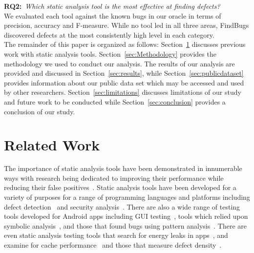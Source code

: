 \documentclass{sig-alternate}
\newcommand{\dan}[1]{\textcolor{blue}{{\it [Dan says: #1]}}}
\begin{document}
\textbf{RQ2:}~\emph{Which static analysis tool is the most effective at finding defects?}\\
We evaluated each tool against the known bugs in our oracle in terms of precision, accuracy and F-measure. While no tool led in all three areas, FindBugs discovered defects at the most consistently high level in each category. \\



The remainder of this paper is organized as follows: Section~\ref{sec:related} discusses previous work with static analysis tools. Section~\ref{sec:Methodology} provides the methodology we used to conduct our analysis. The results of our analysis are provided and discussed in Section~\ref{sec:results}, while Section~\ref{sec:publicdataset} provides information about our public data set which may be accessed and used by other researchers. Section~\ref{sec:limitations} discusses limitations of our study and future work to be conducted while Section~\ref{sec:conclusion} provides a conclusion of our study.

\newpage
\section{Related Work}
\label{sec:related}


The importance of static analysis tools have been demonstrated in innumerable ways with research being dedicated to improving their performance while reducing their false positives~\cite{joshi2014reducing}. Static analysis tools have been developed for a variety of purposes for a range of programming languages and platforms including defect detection~\cite{johnson2013don} and security analysis~\cite{Ware:2008:SJC:1394504.1394506, song2015finding, Feng:2014:ASD:2635868.2635869, Schmeelk:2015:AMS:2746266.2746271}. There are also a wide range of testing tools developed for Android apps including GUI testing~\cite{Hu:2011:AGT:1982595.1982612}, tools which relied upon symbolic analysis~\cite{Mirzaei:2012:TAA:2382756.2382798}, and those that found bugs using pattern analysis~\cite{6924298}. There are even static analysis testing tools that search for energy leaks in apps~\cite{Zhang:2012:AAD:2380445.2380503,}, and examine for cache performance~\cite{banerjee2013static} and those that measure defect density~\cite{Nagappan:2005:SAT:1062455.1062558}.
\end{document}
